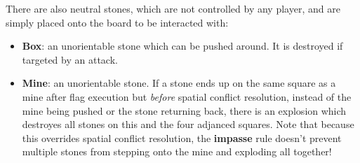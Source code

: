 \documentclass[12pt]{article}
\begin{document}
	There are also neutral stones, which are not controlled by any player, and are simply placed onto the board to be interacted with:
	\begin{itemize}
		\item \textbf{Box}: an unorientable stone which can be pushed around. It is destroyed if targeted by an attack.
		\item \textbf{Mine}: an unorientable stone. If a stone ends up on the same square as a mine after flag execution but \textit{before} spatial conflict resolution, instead of the mine being pushed or the stone returning back, there is an explosion which destroyes all stones on this and the four adjanced squares. Note that because this overrides spatial conflict resolution, the \textbf{impasse} rule doesn't prevent multiple stones from stepping onto the mine and exploding all together!
	\end{itemize}
	
\end{document}
